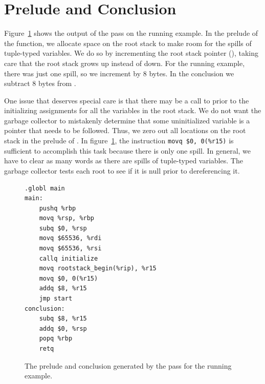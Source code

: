 \documentclass[7x10]{TimesAPriori_MIT}%
\numberwithin{theorem}{chapter}
\numberwithin{definition}{chapter}
\numberwithin{equation}{chapter}
\begin{document}
\section{Prelude and Conclusion}
\label{sec:print-x86-gc}
\label{sec:prelude-conclusion-x86-gc}

Figure~\ref{fig:print-x86-output-gc} shows the output of the
 pass on the running example. In the
prelude of the  function, we allocate space
on the root stack to make room for the spills of tuple-typed
variables. We do so by incrementing the root stack pointer (),
taking care that the root stack grows up instead of down.  For the
running example, there was just one spill, so we increment 
by 8 bytes. In the conclusion we subtract 8 bytes from .

One issue that deserves special care is that there may be a call to
 prior to the initializing assignments for all the
variables in the root stack. We do not want the garbage collector to
mistakenly determine that some uninitialized variable is a pointer that
needs to be followed. Thus, we zero out all locations on the root
stack in the prelude of . In
figure~\ref{fig:print-x86-output-gc}, the instruction
%
\lstinline{movq $0, 0(%r15)}
%
is sufficient to accomplish this task because there is only one spill.
In general, we have to clear as many words as there are spills of
tuple-typed variables. The garbage collector tests each root to see
if it is null prior to dereferencing it. 

\begin{figure}[htbp]
  \begin{tcolorbox}[colback=white]
    \begin{minipage}[t]{0.5\textwidth}
\begin{lstlisting}[basicstyle=\ttfamily\footnotesize]
	.globl main
main:
    pushq %rbp
    movq %rsp, %rbp
    subq $0, %rsp
    movq $65536, %rdi
    movq $65536, %rsi
    callq initialize
    movq rootstack_begin(%rip), %r15
    movq $0, 0(%r15)
    addq $8, %r15
    jmp start
conclusion:
    subq $8, %r15
    addq $0, %rsp
    popq %rbp
    retq
\end{lstlisting}
\end{minipage}
  \end{tcolorbox}

  \caption{The prelude and conclusion generated by the  pass for the running example.}
\label{fig:print-x86-output-gc}
\end{figure}
\end{document}
